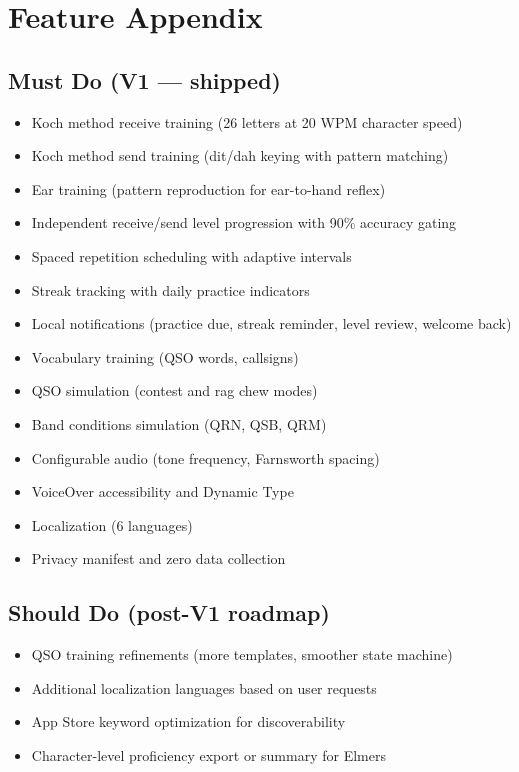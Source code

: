 \documentclass[11pt,letterpaper]{article}
\begin{document}

\section*{Feature Appendix}

\subsection*{Must Do (V1 --- shipped)}

\begin{itemize}[nosep]
  \item Koch method receive training (26 letters at 20 WPM character speed)
  \item Koch method send training (dit/dah keying with pattern matching)
  \item Ear training (pattern reproduction for ear-to-hand reflex)
  \item Independent receive/send level progression with 90\% accuracy gating
  \item Spaced repetition scheduling with adaptive intervals
  \item Streak tracking with daily practice indicators
  \item Local notifications (practice due, streak reminder, level review, welcome back)
  \item Vocabulary training (QSO words, callsigns)
  \item QSO simulation (contest and rag chew modes)
  \item Band conditions simulation (QRN, QSB, QRM)
  \item Configurable audio (tone frequency, Farnsworth spacing)
  \item VoiceOver accessibility and Dynamic Type
  \item Localization (6 languages)
  \item Privacy manifest and zero data collection
\end{itemize}

\subsection*{Should Do (post-V1 roadmap)}

\begin{itemize}[nosep]
  \item QSO training refinements (more templates, smoother state machine)
  \item Additional localization languages based on user requests
  \item App Store keyword optimization for discoverability
  \item Character-level proficiency export or summary for Elmers
\end{itemize}
\end{document}
